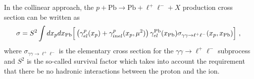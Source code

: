 %
% 
%


In the collinear approach, the $p+\textrm{Pb}\rightarrow \textrm{Pb} + \ell^+\ell^- + X$ production cross section can be written as
%
\begin{equation}
\sigma 
= S^2 \int dx_p dx_{\rm Pb} \Big[
\left ( \gamma^{p}_{el}(x_p) + \gamma^{p}_{inel}(x_p,\mu^2) \right)
 \gamma^{\rm Pb}_{el}(x_{\rm Pb})
\sigma_{\gamma \gamma \rightarrow \ell^+ \ell^-}(x_p, x_{\rm Pb})  \Big]~,
\label{collinear_factorization_formula}
\end{equation}
%
where $\sigma_{\gamma \gamma \rightarrow \ell^+ \ell^-}$
is the elementary cross section for the $\gamma \gamma \rightarrow \ell^+ \ell^-$ subprocess and $S^2$ is the so-called survival factor which takes into account the requirement that there be no hadronic interactions between the proton and the ion.


